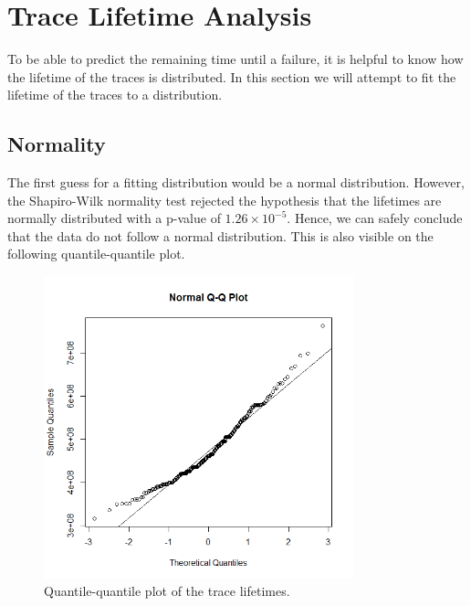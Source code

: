 

\section{Trace Lifetime Analysis}
To be able to predict the remaining time until a failure, it is helpful to know how the lifetime of the traces is distributed. In this section we will attempt to fit the lifetime of the traces to a distribution.

\subsection{Normality}
The first guess for a fitting distribution would be a normal distribution. However, the Shapiro-Wilk normality test rejected the hypothesis that the lifetimes are normally distributed with a p-value of $1.26\times 10^{-5}$. Hence, we can safely conclude that the data do not follow a normal distribution. This is also visible on the following quantile-quantile plot.
\begin{figure}[H]
\centering
\includegraphics[width=0.8\textwidth]{Plots/QQPlot.png}
\caption{Quantile-quantile plot of the trace lifetimes.}
\end{figure}

